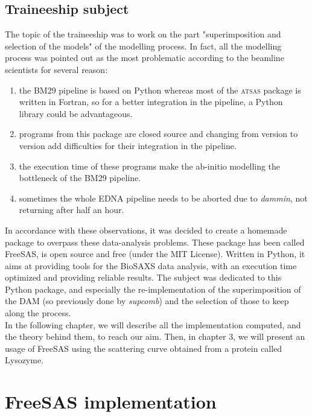 \documentclass[a4paper, 11pt]{report}
\begin{document}
\section{Traineeship subject}

The topic of the traineeship was to work on the part "superimposition 
and selection of the models" of the modelling process. 
In fact, all the modelling process was pointed out as the most 
problematic according to the beamline scientists for several reason:
\begin{enumerate}
\item the BM29 pipeline is based on Python whereas most
of the \textsc{atsas} package is written in Fortran, so for a better 
integration in the pipeline, a Python library could be advantageous. 
\item programs from this package are closed source and 
changing from version to version add difficulties for their 
integration in the pipeline. 
\item the execution time of these programs make the ab-initio modelling the
bottleneck of the BM29 pipeline. 
\item sometimes the whole EDNA pipeline needs to be aborted 
due to \textit{dammin}, not returning after half an hour.
\end{enumerate}

In accordance with these observations, it was decided to create a 
homemade package to overpass these data-analysis problems. 
These package has been called FreeSAS, is open source and free (under 
the MIT License). 
Written in Python, it aims at providing tools for the BioSAXS data 
analysis, with an execution time optimized and providing reliable 
results. 
The subject was dedicated to this Python package, and especially the 
re-implementation of the superimposition of the DAM (so previously 
done by \textit{supcomb}) and the selection of those to keep along the 
process.\\
In the following chapter, we will describe all the implementation 
computed, and the theory behind them, to reach our aim. 
Then, in chapter 3, we will present an usage of FreeSAS using the 
scattering curve obtained from a protein called Lysozyme.


\chapter{FreeSAS implementation}
\end{document}
